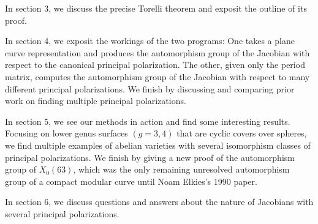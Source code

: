\documentclass[12pt,reqno]{amsart}
\theoremstyle{definition}
\theoremstyle{remark}
\newtheorem*{remark}{Remark}
\begin{document}
In section 3, we discuss the precise Torelli theorem and exposit the outline of its proof. %

In section 4, we exposit the workings of the two programs: One takes a plane curve representation and produces the automorphism group of the Jacobian with respect to the canonical principal polarization. The other, given only the period matrix, computes the automorphism group of the Jacobian with respect to many different principal polarizations. We finish by discussing and comparing prior work on finding multiple principal polarizations.

In section 5, we see our methods in action and find some interesting results. Focusing on lower genus surfaces $(g = 3, 4)$ that are cyclic covers over spheres, we find multiple examples of abelian varieties with several isomorphism classes of principal polarizations. We finish by giving a new proof of the automorphism group of $X_0(63)$, which was the only remaining unresolved automorphism group of a compact modular curve until Noam Elkies's 1990 paper.  

In section 6, we discuss questions and answers about the nature of Jacobians with several principal polarizations. 









\end{document}
